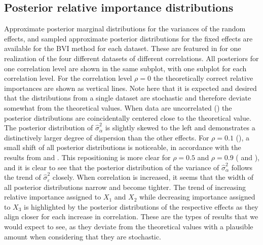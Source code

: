\subsection{Posterior relative importance distributions}
\label{sec:posterior_distributions}
Approximate posterior marginal distributions for the variances of the random effects, and sampled approximate posterior distributions for the fixed effects are available for the BVI method for each dataset.
These are featured in  for one realization of the four different datasets of different correlations.
All posteriors for one correlation level are shown in the same subplot, with one subplot for each correlation level. 
For the correlation level $\rho=0$ the theoretically correct relative importances are shown as vertical lines.
Note here that it is expected and desired that the distributions from a single dataset are stochastic and therefore deviate somewhat from the theoretical values.
When data are uncorrelated () the posterior distributions are coincidentally centered close to the theoretical value.
The posterior distribution of $\hat{\sigma}^2_{\alpha}$ is slightly skewed to the left and demonstrates a distinctively larger degree of dispersion than the other effects.
For $\rho=0.1$ (), a small shift of all posterior distributions is noticeable, in accordance with the results from  and . 
This repositioning is more clear for $\rho=0.5$ and $\rho=0.9$ ( and ), and it is clear to see that the posterior distribution of the variance of $\hat{\sigma}^2_{\alpha}$ follows the trend of $\hat{\sigma}^2_{\varepsilon}$ closely.
When correlation is increased, it seems that the width of all posterior distributions narrow and become tighter.
The trend of increasing relative importance assigned to $X_1$ and $X_2$ while decreasing importance assigned to $X_3$ is highlighted by the posterior distributions of the respective effects as they align closer for each increase in correlation.
These are the types of results that we would expect to see, as they deviate from the theoretical values with a plausible amount when considering that they are stochastic.
